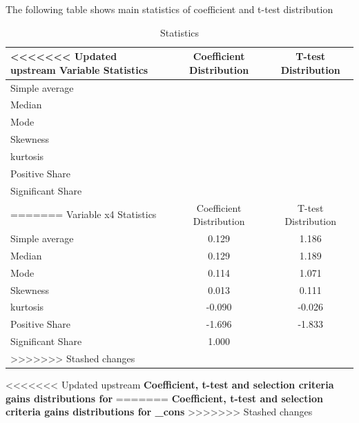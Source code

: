 \documentclass{article}
\begin{document}
\vspace{1cm}

The following table shows main statistics of coefficient and t-test distribution 

\begin{table}[!h]
    \centering
    \caption{Statistics}
    \begin{tabular}{|l|c|c|}
    \hline
<<<<<<< Updated upstream
    Variable  Statistics &  Coefficient Distribution &  T-test Distribution  \\
    \hline
    \hline
    Simple average    &       &  \\
    \hline
    Median            &    &  \\
    \hline
    Mode              &      &  \\
    \hline
    Skewness          &       &  \\
    \hline
    kurtosis          &      &  \\
    \hline
    Positive Share    &      &  \\
    \hline
    Significant Share &  &  \\
=======
    Variable x4 Statistics &  Coefficient Distribution &  T-test Distribution  \\
    \hline
    \hline
    Simple average    & 0.129      & 1.186 \\
    \hline
    Median            & 0.129   & 1.189 \\
    \hline
    Mode              & 0.114     & 1.071 \\
    \hline
    Skewness          & 0.013      & 0.111 \\
    \hline
    kurtosis          & -0.090     & -0.026 \\
    \hline
    Positive Share    & -1.696     & -1.833 \\
    \hline
    Significant Share & 1.000 &  \\
>>>>>>> Stashed changes
    \hline
    \end{tabular}
\end{table}

\clearpage
\begin{center}
<<<<<<< Updated upstream
    \large{\textbf{Coefficient, t-test and selection criteria gains distributions for  }}
=======
    \large{\textbf{Coefficient, t-test and selection criteria gains distributions for _cons }}
>>>>>>> Stashed changes
\end{center}

\vspace{-5mm}
\end{document}
